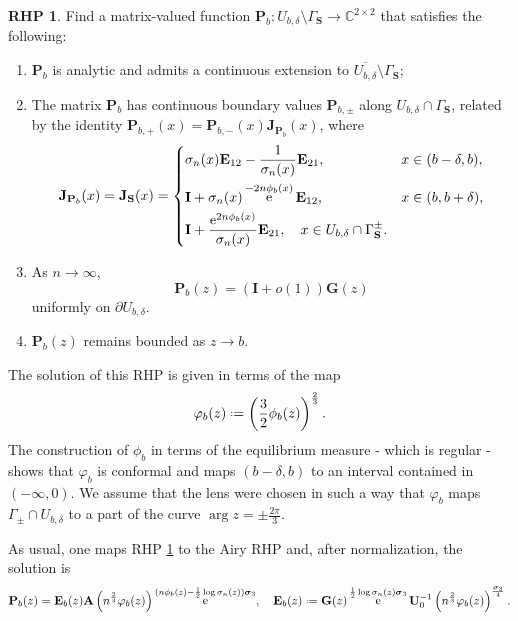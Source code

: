 \documentclass[reqno,a4paper,11pt]{amsart}
\DeclareMathOperator{\ee}{\rm e}
\newcommand{\C}{\mathbb{C}}
\newcommand{\boh}{\mathit{o}}
\renewcommand{\bm}{\mathbf}
\renewcommand{\sp}{\boldsymbol \sigma}
\theoremstyle{definition}
\newtheorem{rhp}[theorem]{RHP}
\theoremstyle{remark}
\numberwithin{equation}{section}
\newcommand*{\defeq}{\mathrel{\vcenter{\baselineskip0.5ex \lineskiplimit0pt
                     \hbox{\scriptsize.}\hbox{\scriptsize.}}}%
                     =}
\begin{document}
\begin{rhp}\label{rhp:local_b}
    Find a matrix-valued function $\bm P_b: U_{b, \delta} \setminus \Gamma_{\bm S} \to \C^{2 \times 2}$ that satisfies the following:
    \begin{enumerate}[\rm (i)]
        \item $\bm P_b$ is analytic and admits a continuous extension to $\overline{U_{b, \delta}} \setminus \Gamma_{\bm S}$;
        \item The matrix $\bm P_b$ has continuous boundary values $\bm P_{b,\pm}$ along $U_{b, \delta} \cap \Gamma_{ \bm S}$, related by the identity $\bm P_{b,+}(x) = \bm P_{b,-}(x) \bm J_{\bm P_b}(x)$, where
        \[
            \bm J_{\bm P_b}(x) = \bm J_{\bm S}(x)=
            \begin{dcases}
                \sigma_n(x) \bm E_{12} - \frac{1}{\sigma_n(x) }\bm E_{21}, \quad &x \in (b - \delta, b), \\
                \bm I + \sigma_n(x) \ee^{-2 n \phi_b(x)} \bm E_{12}, \quad &x \in (b, b+\delta), \\
                \bm I + \frac{\ee^{2 n \phi_b(x)}}{\sigma_n(x)} \bm E_{21}, \quad x \in U_{b, \delta} \cap \Gamma_{\bm S}^\pm.
            \end{dcases}
        \]
        \item As $n \to \infty$,
        \begin{equation}\label{eq:asymptotics_P_b}
            \bm P_b(z) = \left( \bm I + \boh(1)\right) \bm G(z)
        \end{equation}
        uniformly on $\partial U_{b, \delta}$.
        \item   $\bm P_b(z)$ remains bounded as $z \to b$.
    \end{enumerate}
\end{rhp}

The solution of this RHP is given in terms of the map
    \[
        \varphi_b(z) \defeq \left(\frac{3}{2} \phi_b(z)\right)^{\frac{2}{3}}.
    \]
    The construction of $\phi_b$ in terms of the equilibrium measure - which is regular - shows that $\varphi_b$ is conformal and maps $(b-\delta,b)$ to an interval contained in $(-\infty,0)$. We assume that the lens were chosen in such a way that $\varphi_b$ maps $\Gamma_{\pm} \cap U_{b, \delta}$ to a part of the curve $\arg z = \pm \frac{ 2 \pi }{3}$.

    As usual, one maps RHP \ref{rhp:local_b} to the Airy RHP and, after normalization, the solution is
    \[
        \bm P_b(z) =\bm E_b(z) \bm A \left( n^{\frac{2}{3}} \varphi_b(z) \right) \ee^{(n \phi_b(z) - \frac{1}{2} \log \sigma_n(z)) \sp_3}, \quad \bm E_b(z) \defeq  \bm G(z) \ee^{\frac{1}{2} \log \sigma_n(z) \sp_3} \bm U_0^{-1} \left(n^{\frac{2}{3}} \varphi_b(z) \right)^{\frac{\sp_3}{4}}.
    \]
\end{document}
